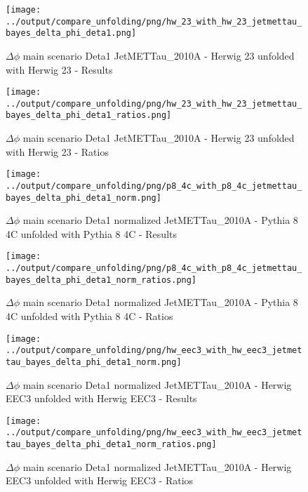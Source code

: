 \documentclass[11pt]{book}
\begin{document}
\begin{figure}[ht]
\centering
\texttt{[image: ../output/compare\_unfolding/png/hw\_23\_with\_hw\_23\_jetmettau\_bayes\_delta\_phi\_deta1.png]}
\caption{$\Delta\phi$ main scenario Deta1 JetMETTau\_2010A - Herwig 23 unfolded with Herwig 23 - Results}
\label{hw_23_hw_23_jetmettau_bayes_delta_phi_deta1_a}
\end{figure}

\begin{figure}[ht]
\centering
\texttt{[image: ../output/compare\_unfolding/png/hw\_23\_with\_hw\_23\_jetmettau\_bayes\_delta\_phi\_deta1\_ratios.png]}
\caption{$\Delta\phi$ main scenario Deta1 JetMETTau\_2010A - Herwig 23 unfolded with Herwig 23 - Ratios}
\label{hw_23_hw_23_jetmettau_bayes_delta_phi_deta1_b}
\end{figure}


\begin{figure}[ht]
\centering
\texttt{[image: ../output/compare\_unfolding/png/p8\_4c\_with\_p8\_4c\_jetmettau\_bayes\_delta\_phi\_deta1\_norm.png]}
\caption{$\Delta\phi$ main scenario Deta1 normalized JetMETTau\_2010A - Pythia 8 4C unfolded with Pythia 8 4C - Results}
\label{p8_p8_jetmettau_bayes_delta_phi_deta1_norm_a}
\end{figure}

\begin{figure}[ht]
\centering
\texttt{[image: ../output/compare\_unfolding/png/p8\_4c\_with\_p8\_4c\_jetmettau\_bayes\_delta\_phi\_deta1\_norm\_ratios.png]}
\caption{$\Delta\phi$ main scenario Deta1 normalized JetMETTau\_2010A - Pythia 8 4C unfolded with Pythia 8 4C - Ratios}
\label{p8_p8_jetmettau_bayes_delta_phi_deta1_norm_b}
\end{figure}

\begin{figure}[ht]
\centering
\texttt{[image: ../output/compare\_unfolding/png/hw\_eec3\_with\_hw\_eec3\_jetmettau\_bayes\_delta\_phi\_deta1\_norm.png]}
\caption{$\Delta\phi$ main scenario Deta1 normalized JetMETTau\_2010A - Herwig EEC3 unfolded with Herwig EEC3 - Results}
\label{hw_eec3_hw_eec3_jetmettau_bayes_delta_phi_deta1_norm_a}
\end{figure}

\begin{figure}[ht]
\centering
\texttt{[image: ../output/compare\_unfolding/png/hw\_eec3\_with\_hw\_eec3\_jetmettau\_bayes\_delta\_phi\_deta1\_norm\_ratios.png]}
\caption{$\Delta\phi$ main scenario Deta1 normalized JetMETTau\_2010A - Herwig EEC3 unfolded with Herwig EEC3 - Ratios}
\label{hw_eec3_hw_eec3_jetmettau_bayes_delta_phi_deta1_norm_b}
\end{figure}
\end{document}
